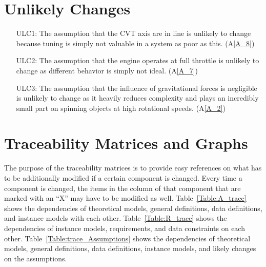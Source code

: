 \documentclass[12pt]{article}
\begin{document}
\section{Unlikely Changes}    

\begin{itemize}

  \item[ULC1:] The assumption that the CVT axis are in line is unlikely to change because tuning is simply not valuable in a system as poor as this. (A\ref{A_8})
  \item[ULC2:] The assumption that the engine operates at full throttle is unlikely to change as different behavior is simply not ideal. (A\ref{A_7})
  \item[ULC3:] The assumption that the influence of gravitational forces is negligible is unlikely to change as it heavily reduces complexity and plays an incredibly small part on spinning objects at high rotational speeds. (A\ref{A_2})
  
  \end{itemize}
\section{Traceability Matrices and Graphs}

The purpose of the traceability matrices is to provide easy references on what
has to be additionally modified if a certain component is changed.  Every time a
component is changed, the items in the column of that component that are marked
with an ``X'' may have to be modified as well.  Table~\ref{Table:A_trace} shows the
dependencies of theoretical models, general definitions, data definitions, and
instance models with each other. Table~\ref{Table:R_trace} shows the
dependencies of instance models, requirements, and data constraints on each
other. Table~\ref{Table:trace_Assumptions} shows the dependencies of theoretical models,
general definitions, data definitions, instance models, and likely changes on
the assumptions.



\end{document}
